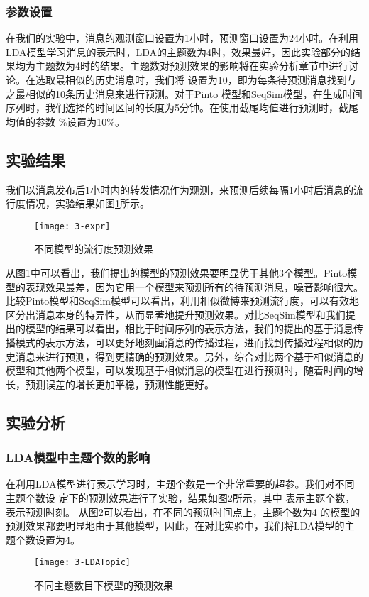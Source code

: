\subsubsection{参数设置}
在我们的实验中，消息的观测窗口设置为1小时，预测窗口设置为24小时。在利用LDA模型学习消息的表示时，LDA的主题数为4时，效果最好，因此实验部分的结果均为主题数为4时的结果。主题数对预测效果的影响将在实验分析章节中进行讨论。在选取最相似的历史消息时，我们将 设置为10，即为每条待预测消息找到与之最相似的10条历史消息来进行预测。对于Pinto 模型和SeqSim模型，在生成时间序列时，我们选择的时间区间的长度为5分钟。在使用截尾均值进行预测时，截尾均值的参数 \%设置为10\%。
\subsection{实验结果}
我们以消息发布后1小时内的转发情况作为观测，来预测后续每隔1小时后消息的流行度情况，实验结果如图\ref{fig:exprResult}所示。
\begin{figure}[!htbp]
  \centering
  \texttt{[image: 3-expr]}
  \caption{不同模型的流行度预测效果}
  \label{fig:exprResult}
\end{figure}


从图\ref{fig:exprResult}中可以看出，我们提出的模型的预测效果要明显优于其他3个模型。Pinto模型的表现效果最差，因为它用一个模型来预测所有的待预测消息，噪音影响很大。比较Pinto模型和SeqSim模型可以看出，利用相似微博来预测流行度，可以有效地区分出消息本身的特异性，从而显著地提升预测效果。对比SeqSim模型和我们提出的模型的结果可以看出，相比于时间序列的表示方法，我们的提出的基于消息传播模式的表示方法，可以更好地刻画消息的传播过程，进而找到传播过程相似的历史消息来进行预测，得到更精确的预测效果。另外，综合对比两个基于相似消息的模型和其他两个模型，可以发现基于相似消息的模型在进行预测时，随着时间的增长，预测误差的增长更加平稳，预测性能更好。
\subsection{实验分析}
\subsubsection{LDA模型中主题个数的影响}
在利用LDA模型进行表示学习时，主题个数是一个非常重要的超参。我们对不同主题个数设
定下的预测效果进行了实验，结果如图\ref{fig:ldaTopic}所示，其中 表示主题个数， 表示预测时刻。
从图\ref{fig:ldaTopic}可以看出，在不同的预测时间点上，主题个数为4 的模型的预测效果都要明显地由于其他模型，因此，在对比实验中，我们将LDA模型的主题个数设置为4。
\begin{figure}[!htbp]
  \centering
  \texttt{[image: 3-LDATopic]}
  \caption{不同主题数目下模型的预测效果}
  \label{fig:ldaTopic}
\end{figure}

